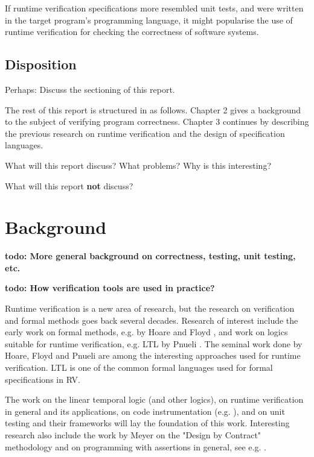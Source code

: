 \documentclass[a4paper,11pt]{kth-mag}
\newcommand{\todo}[1]{\textbf{todo: #1}}
\begin{document}
If runtime verification specifications more resembled unit tests, and were written in the target program's
programming language, it might popularise the use of runtime verification for
checking the correctness of software systems.

\section{Disposition}

Perhaps: Discuss the sectioning of this report.

The rest of this report is structured in as follows. Chapter 2 gives a
background to the subject of verifying program correctness. Chapter 3
continues by describing the previous research on runtime verification and
the design of specification languages. 

What will this report discuss? What problems? Why is this interesting?

What will this report \textbf{not} discuss?



\pagestyle{newchap}
\chapter{Background}

\todo{More general background on correctness, testing, unit testing, etc.}

\todo{How verification tools are used in practice?}

Runtime verification is a new area of research, but the research on verification and formal methods goes back several decades. Research of interest include the early work on formal methods, e.g. by Hoare \cite{hoare69} and Floyd \cite{floyd67}, and work on logics suitable for runtime verification, e.g. LTL by Pnueli \cite{pnueli77}. The seminal work done by Hoare, Floyd and Pnueli are among the interesting approaches used for runtime verification. LTL is one of the common formal languages used for formal specifications in RV.

The work on the linear temporal logic (and other logics), on runtime verification in general and its applications, on code instrumentation (e.g. \cite{aspectj,matusiak09aoppy}), and on unit testing and their frameworks will lay the foundation of this work. Interesting research also include the work by Meyer on the "Design by Contract" methodology \cite{meyer92applyingdbc} and on programming with assertions in general, see e.g. \cite{rosenblum95practicalassertions,bartetzko01jass}.
\end{document}
